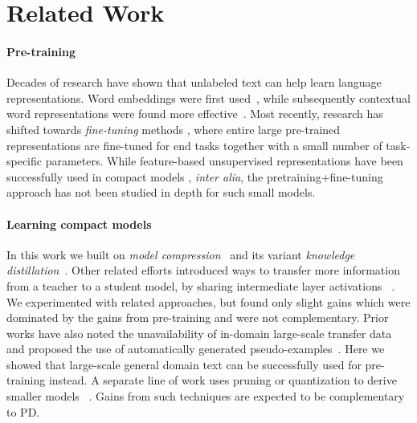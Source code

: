 \section{Related Work}
\label{sec:related}

\paragraph{Pre-training}
Decades of research have shown that unlabeled text can help learn language representations. Word embeddings were first used~\citep{word2vec,glove}, while subsequently contextual word representations were found  more effective~\citep{elmo}. Most recently, research has shifted towards \emph{fine-tuning} methods \citep{openai-gpt,bert,openai-gpt2}, where entire large pre-trained representations are  fine-tuned for end tasks together with a small number of task-specific parameters. While feature-based unsupervised representations have been successfully used in compact models \citep{johnson2015semi, gururangan-etal-2019-variational}, \textit{inter alia}, the pretraining+fine-tuning approach has not been studied in depth for such small models.

\paragraph{Learning compact models}
In this work we built on \emph{model compression}~\citep{model-compression} and its variant \emph{knowledge distillation}~\citep{distillation}. Other related efforts introduced ways to transfer more information from a teacher to a student model, by sharing intermediate layer activations ~\citep{fitnets,yim2017gift,patient_kd}. We experimented with related approaches, but found only slight gains which were dominated by the gains from pre-training and were not complementary. Prior works have also noted the unavailability of in-domain large-scale transfer data and proposed the use of automatically generated pseudo-examples~\citep{model-compression,kimura2018few}. Here we showed that large-scale general domain text can be successfully used for pre-training instead. A separate line of work uses pruning or quantization to derive smaller models ~\citep{han2015deep,Gupta:2015}. Gains from such techniques are expected to be complementary to PD.

